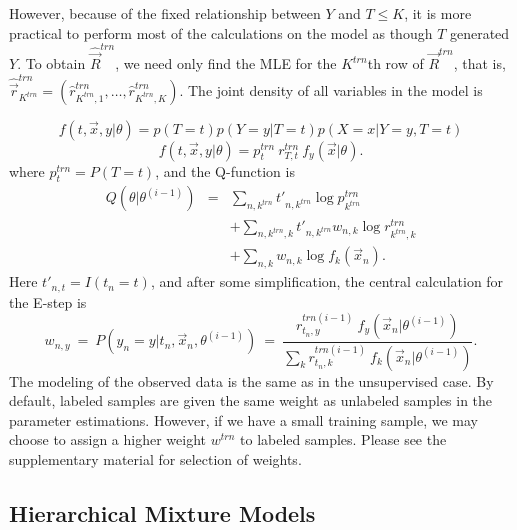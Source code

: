 \documentclass{bmcart}
\begin{document}
However, because of the fixed relationship between $Y$ and $T \leq K$, it is more practical to perform most of the 
calculations on the model as though $T$ generated $Y$.  To obtain $\hat{\vec R}^{trn}$, we need only find the MLE for the 
$K^{trn}$th row of $\vec R^{trn}$, that is, $\hat{\vec r}_{K^{trn}}^{trn} = (\hat r_{K^{trn},1}^{trn}, \ldots, \hat r_{K^{trn},K}
^{trn})$.   The joint density of all variables in the model is

\begin{equation}\label{eqn:methods.f_t_x_y_semisup_mixmod1}
	f(t, \vec x, y | \theta) = p(T=t) p(Y=y|T=t) p(X=x| Y=y,T=t)
\end{equation}
\begin{equation}\label{eqn:methods.f_t_x_y_semisup_mixmod2}
	f(t, \vec x, y | \theta) = p_t^{trn} \ r_{T,t}^{trn} \ f_y(\vec x | \theta).
\end{equation}
where $p_t^{trn} = P(T = t)$, and the Q-function is
\begin{equation}\label{eqn:methods.semisup_marginal_qfun}
	\begin{array}{rcl}
		Q(\theta|\theta^{(i-1)})  & = & \sum_{n, k^{trn}} t'_{n,k^{trn}} \log p_{k^{trn}}^{trn} \\&& + \sum_{n, k^{trn}, k} 
		t'_{n,k^{trn}} w_{n,k} \log r_{k^{trn},k}^{trn} \\&& + \sum_{n,k} w_{n,k} \log f_k(\vec x_n).
	\end{array}
\end{equation}
Here $t'_{n,t} = I(t_n = t)$, and after some simplification, the central calculation for the E-step is
\begin{equation}\label{eqn:methods.w_n_y_semisup_mixmod}
	w_{n,y} \ = \ P(y_n = y | t_n, \vec x_n, \theta^{(i-1)}) \ = \ \frac{r_{t_n,y}^{trn (i-1)} \ f_y(\vec x_n | \theta^{(i-1)})}
	{\sum_k r_{t_n,k}^{trn (i-1)} \ f_k(\vec x_n | \theta^{(i-1)})}.
\end{equation}
The modeling of the observed data is the same as in the unsupervised case. By default, labeled samples are given the same weight as unlabeled samples in the parameter estimations.  However, if we  have a small training sample, we may choose to assign a higher weight $w^{trn}$ to labeled samples.  Please see the supplementary material for selection of weights.

 
 \subsection*{Hierarchical Mixture Models}
\end{document}
